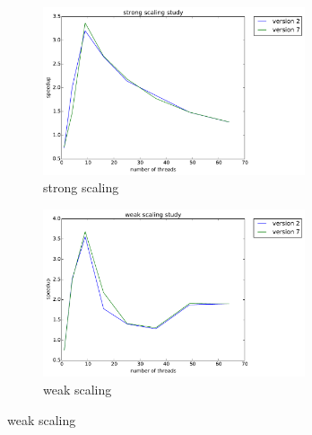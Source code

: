 \documentclass[12pt]{article}
\numberwithin{equation}{section}
\begin{document}
\begin{figure}[!ht]
   \begin{subfigure}
      \centering
        \begin{center}
      \includegraphics[width=0.85\textwidth] {plots/domain_offload_strong}
        \end{center}
      \label{aload0}
      \caption{strong scaling}
  \end{subfigure}
  \begin{subfigure}
      \centering
        \begin{center}
      \includegraphics[width=0.85\textwidth] {plots/domain_offload_weak}
        \end{center}
      \label{aload1}
      \caption{weak scaling}
  \end{subfigure}

\end{figure}
\end{document}
